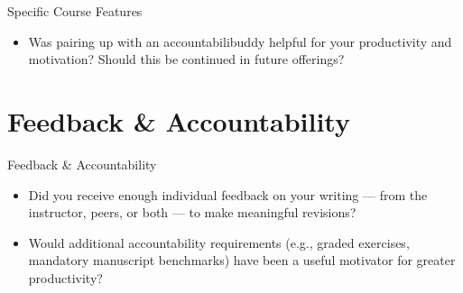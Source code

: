 \documentclass{beamer}
\begin{document}
\begin{frame}{Specific Course Features}
  \begin{itemize}
    \item Was pairing up with an accountabilibuddy helpful for your productivity and motivation?
      Should this be continued in future offerings?
  \end{itemize}
\end{frame}


\section{Feedback \& Accountability}

\begin{frame}{Feedback \& Accountability}
  \begin{itemize}
    \item Did you receive enough individual feedback on your writing --- from the instructor, peers, or both --- to make meaningful revisions?
    \bigskip
    \item Would additional accountability requirements (e.g., graded exercises, mandatory manuscript benchmarks) have been a useful motivator for greater productivity?
  \end{itemize}
\end{frame}

\end{document}
